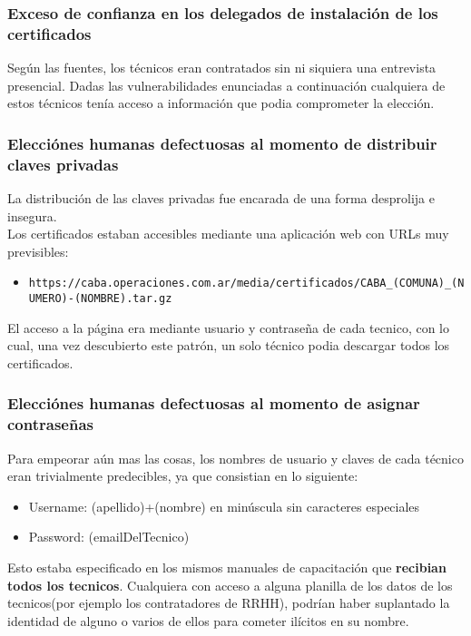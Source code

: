 \subsubsection{Exceso de confianza en los delegados de instalación de los certificados}

Según las fuentes, los técnicos eran contratados sin ni siquiera una entrevista presencial. Dadas las vulnerabilidades enunciadas a continuación cualquiera de estos técnicos tenía acceso a información que podia comprometer la elección.

\subsubsection{Elecciónes humanas defectuosas al momento de distribuir claves privadas}

La distribución de las claves privadas fue encarada de una forma desprolija e insegura.\\

Los certificados estaban accesibles mediante una aplicación web con URLs muy previsibles:\\

\begin{itemize}
	\item \texttt{https://caba.operaciones.com.ar/media/certificados/CABA\_(COMUNA)\_(NUMERO)-(NOMBRE).tar.gz}
\end{itemize}

El acceso a la página era mediante usuario y contraseña de cada tecnico, con lo cual, una vez descubierto este patrón, un solo técnico podia descargar todos los certificados.

\subsubsection{Elecciónes humanas defectuosas al momento de asignar contraseñas}
Para empeorar aún mas las cosas, los nombres de usuario y claves de cada técnico eran trivialmente predecibles, ya que consistian en lo siguiente:

\begin{itemize}
	\item Username: (apellido)+(nombre) en minúscula sin caracteres especiales
	\item Password: (emailDelTecnico)
\end{itemize}

Esto estaba especificado en los mismos manuales de capacitación que \textbf{recibian todos los tecnicos}. Cualquiera con acceso a alguna planilla de los datos de los tecnicos(por ejemplo los contratadores de RRHH), podrían haber suplantado la identidad de alguno o varios de ellos para cometer ilícitos en su nombre.

